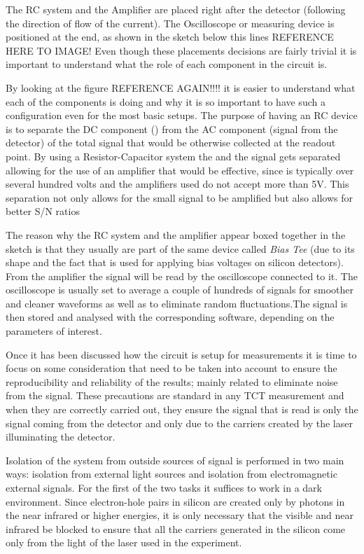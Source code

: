 The RC system and the Amplifier are placed right after the detector (following the direction of flow of the current). The Oscilloscope or measuring device is positioned at the end, as shown in the sketch below this lines REFERENCE HERE TO IMAGE! Even though these placements decisions are fairly trivial it is important to understand what the role of each component in the circuit is.

By looking at the figure REFERENCE AGAIN!!!! it is easier to understand what each of the components is doing and why it is so important to have such a configuration even for the most basic setups. The purpose of having an RC device is to separate the DC component (\vias) from the AC component (signal from the detector) of the total signal that would be otherwise collected at the readout point. By using a Resistor-Capacitor system the \vias and the signal gets separated allowing for the use of an amplifier that would be effective, since \vias is typically over several hundred volts and the amplifiers used do not accept more than 5V. This separation not only allows for the small signal to be amplified but also allows for better S/N ratios 

The reason why the RC system and the amplifier appear boxed together in the sketch is that they usually are part of the same device called \textit{Bias Tee} (due to its shape and the fact that is used for applying bias voltages on silicon detectors). From the amplifier the signal will be read by the oscilloscope connected to it. The oscilloscope is usually set to average a couple of hundreds of signals for smoother and cleaner waveforms as well as to eliminate random fluctuations.The signal is then stored and analysed with the corresponding software, depending on the parameters of interest.

Once it has been discussed how the circuit is setup for measurements it is time to focus on some consideration that need to be taken into account to ensure the reproducibility and reliability of the results; mainly related to eliminate noise from the signal. These precautions are standard in any TCT measurement and when they are correctly carried out, they ensure the signal that is read is  only the signal coming from the detector and only due to the carriers created by the laser illuminating the detector.

Isolation of the system from outside sources of signal is performed in two main ways: isolation from external light sources and isolation from electromagnetic external signals. For the first of the two tasks it suffices to work in a dark environment. Since electron-hole pairs in silicon are created only by photons in the near infrared or higher energies, it is only necessary that the visible and near infrared be blocked to ensure that all the carriers generated in the silicon come only from the light of the laser used in the experiment.

